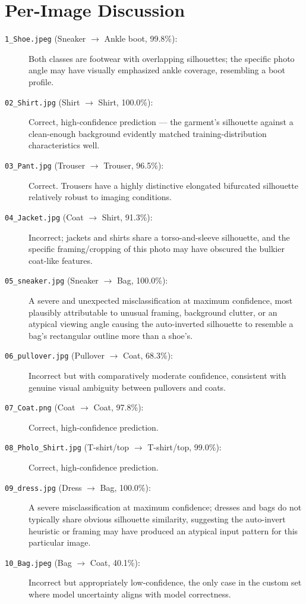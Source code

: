 \documentclass[12pt,a4paper]{report}
\begin{document}
\section{Per-Image Discussion}
\begin{description}
    \item[\texttt{1\_Shoe.jpeg} (Sneaker $\to$ Ankle boot, 99.8\%):] Both classes are footwear with overlapping silhouettes; the specific photo angle may have visually emphasized ankle coverage, resembling a boot profile.
    \item[\texttt{02\_Shirt.jpg} (Shirt $\to$ Shirt, 100.0\%):] Correct, high-confidence prediction — the garment's silhouette against a clean-enough background evidently matched training-distribution characteristics well.
    \item[\texttt{03\_Pant.jpg} (Trouser $\to$ Trouser, 96.5\%):] Correct. Trousers have a highly distinctive elongated bifurcated silhouette relatively robust to imaging conditions.
    \item[\texttt{04\_Jacket.jpg} (Coat $\to$ Shirt, 91.3\%):] Incorrect; jackets and shirts share a torso-and-sleeve silhouette, and the specific framing/cropping of this photo may have obscured the bulkier coat-like features.
    \item[\texttt{05\_sneaker.jpg} (Sneaker $\to$ Bag, 100.0\%):] A severe and unexpected misclassification at maximum confidence, most plausibly attributable to unusual framing, background clutter, or an atypical viewing angle causing the auto-inverted silhouette to resemble a bag's rectangular outline more than a shoe's.
    \item[\texttt{06\_pullover.jpg} (Pullover $\to$ Coat, 68.3\%):] Incorrect but with comparatively moderate confidence, consistent with genuine visual ambiguity between pullovers and coats.
    \item[\texttt{07\_Coat.png} (Coat $\to$ Coat, 97.8\%):] Correct, high-confidence prediction.
    \item[\texttt{08\_Pholo\_Shirt.jpg} (T-shirt/top $\to$ T-shirt/top, 99.0\%):] Correct, high-confidence prediction.
    \item[\texttt{09\_dress.jpg} (Dress $\to$ Bag, 100.0\%):] A severe misclassification at maximum confidence; dresses and bags do not typically share obvious silhouette similarity, suggesting the auto-invert heuristic or framing may have produced an atypical input pattern for this particular image.
    \item[\texttt{10\_Bag.jpeg} (Bag $\to$ Coat, 40.1\%):] Incorrect but appropriately low-confidence, the only case in the custom set where model uncertainty aligns with model correctness.
\end{description}
\end{document}

